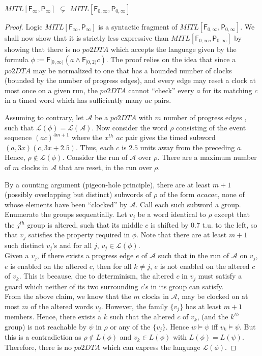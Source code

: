 \documentclass{llncs}
\newcommand{\fut}{\textsf{F}}
\newcommand{\past}{\textsf{P}}
\newcommand{\potdta}{\mbox{$\mathit{po2DTA}$}}
\newcommand{\autm}{\mathcal A}
\newcommand{\mitlfpinf}{\mbox{$\mathit{MITL[\fut_\infty,\past_\infty]}$}}
\newcommand{\mitlfpzinf}{\mbox{$\mathit{MITL[\fut_{0,\infty},\past_{0,\infty}]}$}}
\begin{document}
\begin{theorem}
\label{thm:fpexpress}
\mitlfpinf\/ $\subsetneq$ \mitlfpzinf
\end{theorem}
\begin{proof}
Logic \mitlfpinf\/ is a syntactic fragment of \mitlfpzinf. We shall now show that it is strictly less expressive than \mitlfpzinf\/ by showing that there is no \potdta\/ which accepts the language given by the formula $\phi:= \fut_{[0,\infty)}(a\land \fut_{[0,2)} c)$. The proof relies on the idea that since a \potdta\/ may be normalized to one that has a bounded number of clocks (bounded by the number of progress edges), and every edge may reset a clock at most once on a given run, the \potdta\/ cannot ``check'' every $a$  for its matching $c$ in a timed word which has sufficiently many $ac$ pairs.

Assuming to contrary, let $\autm$ be a \potdta\/ with $m$ number of progress edges , such that $\mathcal L(\phi)=\mathcal L(\autm)$. Now consider the word $\rho$ consisting of the event sequence $(ac)^{4m+1}$ where the $x^{th}$ $ac$ pair gives the timed subword $(a,3x)(c,3x+2.5)$. Thus, each $c$ is $2.5$ units away from the preceding $a$. Hence, $\rho\not\in\mathcal L(\phi)$. 
Consider the run of $\autm$ over $\rho$. 
There are a maximum number of $m$ clocks in $\autm$ that are reset, in the run over $\rho$.

By a counting argument (pigeon-hole principle), there are at least $m+1$ (possibly overlapping but distinct) subwords of $\rho$ of the form $acacac$, none of whose elements have been ``clocked'' by $\autm$. Call each such subword a group. Enumerate the groups sequentially.
Let $v_j$ be a word identical to $\rho$ except that the $j^{th}$ group is altered, such that its middle $c$ is shifted by 0.7 t.u. to the left, so that $v_j$ satisfies the property required in $\phi$. Note that there are at least $m+1$ such distinct $v_j$'s and for all $j$, $v_j\in\mathcal L(\phi)$. \\
Given a $v_j$, if there exists a progress edge $e$ of $\autm$ such that in the run of $\autm$ on $v_j$, $e$ is enabled on the altered $c$, then for all $k\neq j$, $e$ is not enabled on the altered $c$ of $v_k$. This is because, due to determinism, the altered $c$ in $v_j$ must satisfy a guard which neither of its two surrounding $c$'s in its group can satisfy. \\
From the above claim, we know that the $m$ clocks in $\autm$, may be clocked on at most $m$ of the altered words $v_j$. However, the family $\{v_j\}$ has at least $m+1$ members. Hence, there exists a $k$ such that the altered $c$ of $v_k$, (and the $k^{th}$ group) is not reachable 
by $\psi$ in $\rho$ or any of the $\{v_j\}$. Hence $w\models\psi$ iff $v_k\models \psi$. But this is
a contradiction as $\rho \notin L(\phi)$ and $v_k \in L(\phi)$ with $L(\phi)=L(\psi)$. \\
Therefore, there is no \potdta\/ which can express the language $\mathcal L(\phi)$.
\end{proof}
\end{document}
